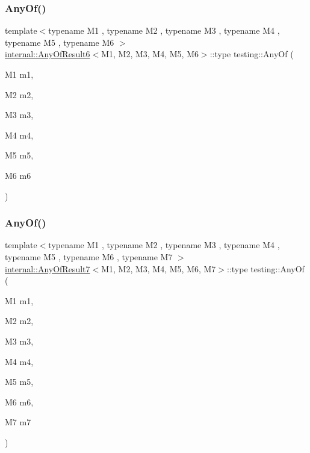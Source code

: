\subsubsection{\texorpdfstring{AnyOf()}{AnyOf()}\hspace{0.1cm}{\footnotesize\ttfamily [5/9]}}
{\footnotesize\ttfamily template$<$typename M1 , typename M2 , typename M3 , typename M4 , typename M5 , typename M6 $>$ \\
\mbox{\hyperlink{structtesting_1_1internal_1_1AnyOfResult6}{internal\+::\+Any\+Of\+Result6}}$<$M1, M2, M3, M4, M5, M6$>$\+::type testing\+::\+Any\+Of (\begin{DoxyParamCaption}\item[{M1}]{m1,  }\item[{M2}]{m2,  }\item[{M3}]{m3,  }\item[{M4}]{m4,  }\item[{M5}]{m5,  }\item[{M6}]{m6 }\end{DoxyParamCaption})\hspace{0.3cm}{\ttfamily [inline]}}

\mbox{\label{namespacetesting_a754d1bddb237e79613f6834af3329efa}} 
\subsubsection{\texorpdfstring{AnyOf()}{AnyOf()}\hspace{0.1cm}{\footnotesize\ttfamily [6/9]}}
{\footnotesize\ttfamily template$<$typename M1 , typename M2 , typename M3 , typename M4 , typename M5 , typename M6 , typename M7 $>$ \\
\mbox{\hyperlink{structtesting_1_1internal_1_1AnyOfResult7}{internal\+::\+Any\+Of\+Result7}}$<$M1, M2, M3, M4, M5, M6, M7$>$\+::type testing\+::\+Any\+Of (\begin{DoxyParamCaption}\item[{M1}]{m1,  }\item[{M2}]{m2,  }\item[{M3}]{m3,  }\item[{M4}]{m4,  }\item[{M5}]{m5,  }\item[{M6}]{m6,  }\item[{M7}]{m7 }\end{DoxyParamCaption})\hspace{0.3cm}{\ttfamily [inline]}}

